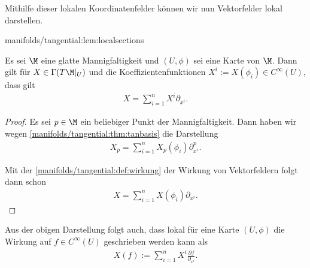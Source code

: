 \documentclass[letterpaper,10pt,german]{jupyterBook}
\begin{document}
\par
Mithilfe dieser lokalen Koordinatenfelder können wir nun Vektorfelder lokal darstellen.
\begin{lemma}{}{manifolds/tangential:lem:localsections}



\par
Es sei \(\M\) eine glatte Mannigfaltigkeit und \((U,\phi)\) sei eine Karte von \(\M\).
Dann gilt für \(X\in\Gamma(T\M\rvert_U)\) und die Koeffizientenfunktionen \(X^i:=X(\phi_i)\in C^\infty(U)\), dass gilt
\begin{align*}
X = \sum_{i=1}^n X^i \partial_{x^{i}}.
\end{align*}\end{lemma}

\begin{proof}
 Es sei \(p\in\M\) ein beliebiger Punkt der Mannigfaltigkeit.
Dann haben wir wegen \cref{manifolds/tangential:thm:tanbasis} die Darstellung
\begin{align*}
X_p = \sum_{i=1}^n X_p(\phi_i) \partial_{x^i}^p.
\end{align*}
\par
Mit der \cref{manifolds/tangential:def:wirkung} der Wirkung von Vektorfeldern folgt dann schon
\begin{align*}
X = \sum_{i=1}^n X(\phi_i) \partial_{x^i}.
\end{align*}\end{proof}

\par
Aus der obigen Darstellung folgt auch, dass lokal für eine Karte \((U,\phi)\) die Wirkung auf \(f\in C^\infty(U)\) geschrieben werden kann als
\begin{align*}
X(f) := \sum_{i=1}^n X^i \frac{\partial f}{\partial_{x^i}}.
\end{align*}
\end{document}
